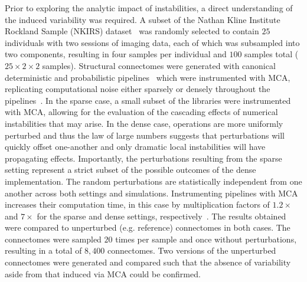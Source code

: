 \documentclass[fleqn,10pt]{SelfArx} %
\newcommand{\new}[1]{{#1}}
\begin{document}
Prior to exploring the analytic impact of instabilities, a direct understanding of the induced variability was
required. A subset of the Nathan Kline Institute Rockland Sample (NKIRS) dataset~\cite{Nooner2012-eg} was randomly
selected to contain $25$ individuals with two sessions of imaging data, each of which was subsampled into two
components, resulting in four \new{samples} per individual \new{and $100$ samples total ($25 \times 2 \times 2$ samples)}. Structural connectomes were generated with canonical
deterministic and probabilistic pipelines~\cite{Garyfallidis2014-ql,Garyfallidis2012-gg} which were instrumented with
MCA, replicating computational noise either \new{sparsely} or \new{densely} throughout the pipelines~\cite{Denis2016-wo,Kiar2020-lb}.
\new{In the sparse case, a small subset of the libraries were instrumented with MCA, allowing for the evaluation of the
cascading effects of numerical instabilities that may arise. In the dense case, operations are more uniformly perturbed
and thus the law of large numbers suggests that perturbations will quickly offset one-another and only dramatic local
instabilities will have propagating effects. Importantly, the perturbations resulting from the sparse setting
represent a strict subset of the possible outcomes of the dense implementation. The random perturbations are statistically independent from one another
across both settings and simulations. Instrumenting pipelines with MCA increases their computation time, in this
case by multiplication factors of $1.2 \times$ and $7 \times$ for the sparse and dense settings, respectively~\cite{Kiar2020-lb}.
The results obtained were compared to unperturbed (e.g. reference) connectomes in both cases.}
The \new{connectomes} were sampled \new{$20$} times per \new{sample} and once without perturbations, resulting in a total of
$8,400$ connectomes. \new{Two versions of the unperturbed connectomes were generated and compared such that the absence
of variability aside from that induced via MCA could be confirmed}.
\end{document}
